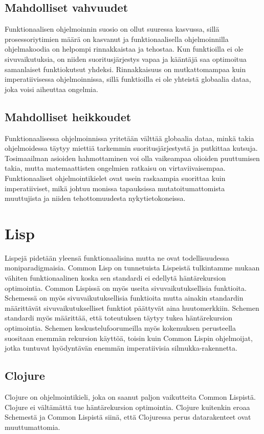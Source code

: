 \documentclass[12pt]{article}
\begin{document}
\subsection{Mahdolliset vahvuudet}
Funktionaalisen ohjelmoinnin suosio on ollut suuressa kasvussa, sillä prosessoriytimien määrä on kasvanut ja funktionaalisella ohjelmoinnilla ohjelmakoodia on helpompi rinnakkaistaa ja tehostaa. Kun funktioilla ei ole sivuvaikutuksia, on niiden suoritusjärjestys vapaa ja kääntäjä saa optimoitua samanlaiset funktiokutsut yhdeksi. Rinnakkaisuus on mutkattomampaa kuin imperatiivisessa ohjelmoinnissa, sillä funktioilla ei ole yhteistä globaalia dataa, joka voisi aiheuttaa ongelmia.
\subsection{Mahdolliset heikkoudet}
Funktionaalisessa ohjelmoinnissa yritetään välttää globaalia dataa, minkä takia ohjelmoidessa täytyy miettiä tarkemmin suoritusjärjestystä ja putkittaa kutsuja. Tosimaailman asioiden hahmottaminen voi olla vaikeampaa olioiden puuttumisen takia, mutta matemaattisten ongelmien ratkaisu on virtaviivaisempaa. Funktionaaliset ohjelmointikielet ovat usein raskaampia suorittaa kuin imperatiiviset, mikä johtuu monissa tapauksissa mutatoitumattomista muuttujista ja niiden tehottomuudesta nykytietokoneissa.

\section{Lisp}
Lispejä pidetään yleensä funktionaalisina mutta ne ovat todellisuudessa moniparadigmaisia. Common Lisp on tunnetuista Lispeistä tulkintamme mukaan vähiten funktionaalinen koska sen standardi ei edellytä häntärekursion optimointia. Common Lispissä on myös useita sivuvaikutuksellisia funktioita. Schemessä on myös sivuvaikutuksellisia funktioita mutta ainakin standardin määrittävät sivuvaikutukselliset funktiot päättyvät aina huutomerkkiin. Schemen standardi myös määrittää, että toteutuksen täytyy tukea häntärekursion optimointia. Schemen keskustelufoorumeilla myös kokemuksen perusteella suositaan enemmän rekursion käyttöä, toisin kuin Common Lispin ohjelmoijat, jotka tuntuvat hyödyntävän enemmän imperatiivisia silmukka-rakennetta.

\subsection{Clojure}
Clojure on ohjelmointikieli, joka on saanut paljon vaikutteita Common Lispistä. Clojure ei vältämättä tue häntärekursion optimointia. Clojure kuitenkin eroaa Schemestä ja Common Lispistä siinä, että Clojuressa perus datarakenteet ovat muuttumattomia. 
\end{document}
